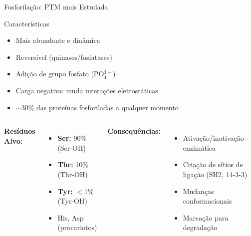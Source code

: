 \begin{frame}[shrink=5]{Fosforilação: PTM mais Estudada}
\begin{block}{Características}
\begin{itemize}
    \item Mais abundante e dinâmica
    \item Reversível (quinases/fosfatases)
    \item Adição de grupo fosfato (PO$_4^{3-}$)
    \item Carga negativa: muda interações eletrostáticas
    \item $\sim$30\% das proteínas fosforiladas a qualquer momento
\end{itemize}
\end{block}

\vspace{0.3cm}

\begin{columns}
\textbf{Resíduos Alvo:}
\begin{itemize}
    \item \textbf{Ser:} 90\% (Ser-OH)
    \item \textbf{Thr:} 10\% (Thr-OH)
    \item \textbf{Tyr:} $<$1\% (Tyr-OH)
    \item His, Asp (procariotos)
\end{itemize}

\textbf{Consequências:}
\begin{itemize}
    \item Ativação/inativação enzimática
    \item Criação de sítios de ligação (SH2, 14-3-3)
    \item Mudanças conformacionais
    \item Marcação para degradação
\end{itemize}
\end{columns}
\end{frame}

